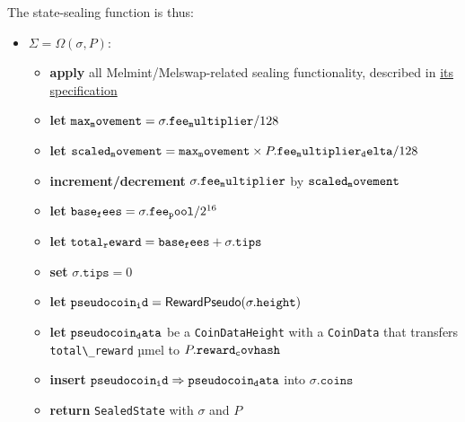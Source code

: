 \documentclass[
]{article}
\newcommand{\passthrough}[1]{#1}
\providecommand{\tightlist}{%
  \setlength{\itemsep}{0pt}\setlength{\parskip}{0pt}}
\begin{document}
The state-sealing function is thus:

\begin{itemize}
  \tightlist
  \item
        \(\Sigma=\Omega(\sigma, P)\):

        \begin{itemize}
          \tightlist
          \item
                \textbf{apply} all Melmint/Melswap-related sealing functionality,
                described in \href{/specifications/tech-melmint}{its specification}
          \item
                \textbf{let}
                \(\mathtt{max\\_movement}=\sigma.\mathtt{fee\\_multiplier}/128\)
          \item
                \textbf{let}
                \(\mathtt{scaled\\_movement}=\mathtt{max\\_movement}\times P.\mathtt{fee\\_multiplier\\_delta}/128\)
          \item
                \textbf{increment/decrement} \(\sigma.\mathtt{fee\\_multiplier}\) by
                \(\mathtt{scaled\\_movement}\)
          \item
                \textbf{let}
                \(\mathtt{base\\_fees}=\sigma.\mathtt{fee\\_pool}/2^{16}\)
          \item
                \textbf{let}
                \(\mathtt{total\\_reward}=\mathtt{base\\_fees}+\sigma.\mathtt{tips}\)
          \item
                \textbf{set} \(\sigma.\mathtt{tips}=0\)
          \item
                \textbf{let}
                \(\mathtt{pseudocoin\\_id}=\mathsf{RewardPseudo}(\sigma.\mathtt{height})\)
          \item
                \textbf{let} \(\mathtt{pseudocoin\\_data}\) be a
                \passthrough{\lstinline!CoinDataHeight!} with a
                \passthrough{\lstinline!CoinData!} that transfers
                \passthrough{\lstinline!total\_reward!} µmel to
                \(P.\mathtt{reward\\_covhash}\)
          \item
                \textbf{insert}
                \(\mathtt{pseudocoin\\_id} \Rightarrow \mathtt{pseudocoin\\_data}\)
                into \(\sigma.\mathtt{coins}\)
          \item
                \textbf{return} \passthrough{\lstinline!SealedState!} with
                \(\sigma\) and \(P\)
        \end{itemize}
\end{itemize}
\end{document}
